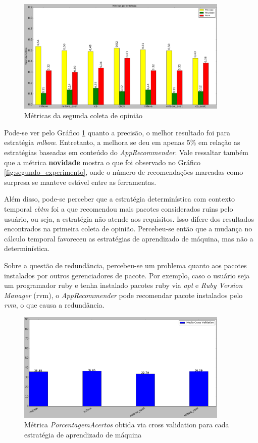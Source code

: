 \begin{figure}[h]
  \centering
  \includegraphics[width=0.9\textwidth]{figuras/metricas_segundo_experimento.eps}
  \caption{Métricas da segunda coleta de opinião}
  \label{fig:metricas_segundo_experimento}
\end{figure}

Pode-se ver pelo Gráfico \ref{fig:metricas_segundo_experimento} quanto a
precisão, o melhor resultado foi para estratégia \textit{mlbow}. Entretanto, a
melhora se deu em apenas 5\% em relação as estratégias baseadas em conteúdo do
\textit{AppRecommender}. Vale ressaltar também que a métrica \textbf{novidade}
mostra o que foi observado no Gráfico \ref{fig:segundo_experimento}, onde o
número de recomendações marcadas como surpresa se manteve estável entre as
ferramentas.

Além disso, pode-se perceber que a estratégia determinística com contexto
temporal \textit{cbtm} foi a que recomendou mais pacotes considerados ruins
pelo usuário, ou seja, a estratégia não atende aos requisitos. Isso difere dos
resultados encontrados na primeira coleta de opinião. Percebeu-se então que a mudança
no cálculo temporal favoreceu as estratégias de aprendizado de máquina, mas não
a determinística.

Sobre a questão de redundância, percebeu-se um problema quanto aos pacotes
instalados por outros gerenciadores de pacote. Por exemplo, caso o usuário seja
um programador ruby e tenha instalado pacotes ruby via \textit{apt} e
\textit{Ruby Version Manager} (rvm), o \textit{AppRecommender} pode recomendar
pacote instalados pelo \textit{rvm}, o que causa a redundância.

\begin{figure}[h]
  \centering
  \includegraphics[width=0.9\textwidth]{figuras/segundo_experimento_cross_validation.eps}
    \caption{Métrica \textit{PorcentagemAcertos} obtida via cross validation para
    cada estratégia de aprendizado de máquina}
  \label{fig:segundo_experimento_cross_validation}
\end{figure}

